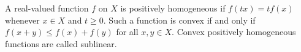 A real-valued function $f$ on $X$ is positively homogeneous if $f(tx) = tf(x)$ whenever $x \in X$ and $t \geqslant 0$. Such a function is convex if and only if $f(x+y) \leqslant f(x) + f(y)$ for all $x, y \in X$. Convex positively homogeneous functions are called sublinear.